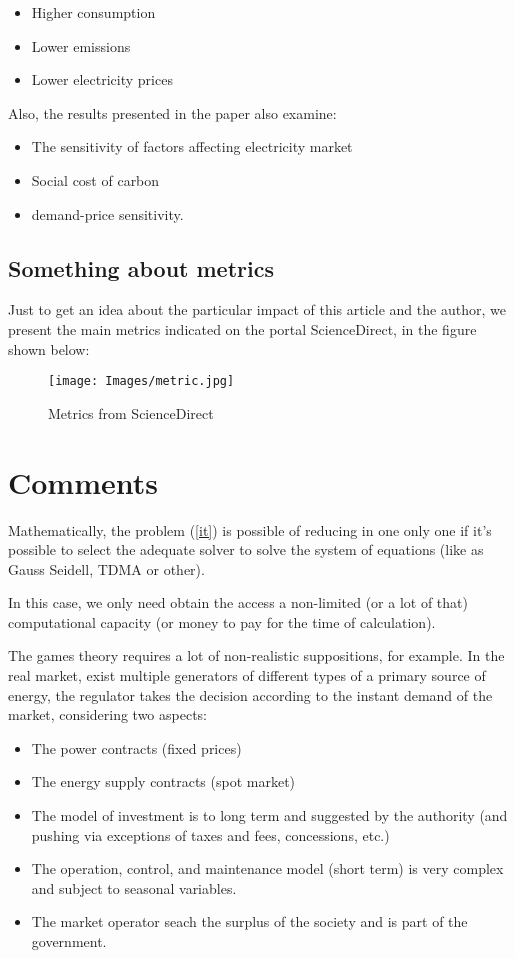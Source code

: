\documentclass{article}
\begin{document}
\begin{itemize}
    \item Higher consumption
    \item Lower emissions
    \item Lower electricity prices
\end{itemize}

Also, the results presented in the paper also examine:

\begin{itemize}
    \item The sensitivity of factors affecting electricity market
    \item Social cost of carbon
    \item demand-price sensitivity. 
\end{itemize}

\subsection{Something about metrics}

Just to get an idea about the particular impact of this article and the author, we present the main metrics indicated on the portal ScienceDirect, in the figure shown below:

\begin{figure}[h]
\texttt{[image: Images/metric.jpg]}
\centering
\caption{Metrics from ScienceDirect}
\label{etiqueta}
\end{figure}

\section{Comments}

Mathematically, the problem (\ref{it}) is possible of reducing in one only one if it's possible to select the adequate solver to solve the system of equations (like as Gauss Seidell, TDMA or other).

In this case, we only need obtain the access a non-limited (or a lot of that) computational capacity (or money to pay for the time of calculation).

The games theory requires a lot of non-realistic suppositions, for example.
In the real market, exist multiple generators of different types of a primary source of energy, the regulator takes the decision according to the instant demand of the market, considering two aspects:

\begin{itemize}
    \item The power contracts (fixed prices)
    \item The energy supply contracts (spot market)
    \item The model of investment is to long term and suggested by the authority (and pushing via exceptions of taxes and fees,  concessions, etc.)
    \item The operation, control, and maintenance model (short term) is very complex and subject to seasonal variables.
    \item The market operator seach the surplus of the society and is part of the government.
\end{itemize}
\end{document}
